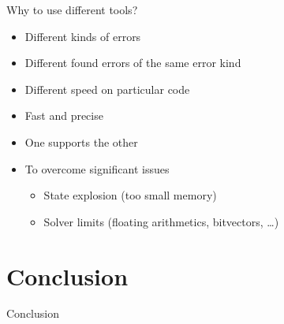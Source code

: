 \begin{frame}{Why to use different tools?}

  \begin{itemize}
    \item Different kinds of errors
    \item Different found errors of the same error kind
    \item Different speed on particular code
  \end{itemize}

  \pause
  \medskip

  \begin{itemize}
    \item Fast and precise
    \item One supports the other
    \item To overcome significant issues
    \begin{itemize}
      \item State explosion (too small memory)
      \item Solver limits (floating arithmetics, bitvectors, \dots)
    \end{itemize}
  \end{itemize}

\end{frame}

\section{Conclusion}

\begin{frame}{Conclusion}

  \begin{center}

    \medskip


    \pause
    \bigskip
    \bigskip
    \bigskip

  \end{center}
\end{frame}


